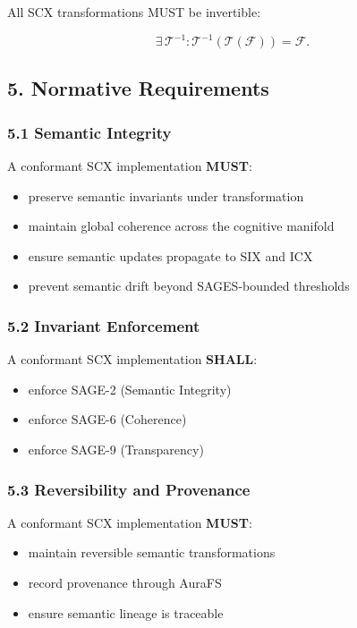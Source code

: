 All SCX transformations MUST be invertible:

\[
\exists \, \mathcal{T}^{-1} : \mathcal{T}^{-1}(\mathcal{T}(\mathcal{F})) = \mathcal{F}.
\]

\subsection{5. Normative Requirements}\label{normative-requirements}

\subsubsection{5.1 Semantic Integrity}\label{semantic-integrity}

A conformant SCX implementation \textbf{MUST}:

\begin{itemize}
\tightlist
\item
  preserve semantic invariants under transformation
\item
  maintain global coherence across the cognitive manifold
\item
  ensure semantic updates propagate to SIX and ICX
\item
  prevent semantic drift beyond SAGES-bounded thresholds
\end{itemize}

\subsubsection{5.2 Invariant Enforcement}\label{invariant-enforcement}

A conformant SCX implementation \textbf{SHALL}:

\begin{itemize}
\tightlist
\item
  enforce SAGE-2 (Semantic Integrity)
\item
  enforce SAGE-6 (Coherence)
\item
  enforce SAGE-9 (Transparency)
\end{itemize}

\subsubsection{5.3 Reversibility and Provenance}\label{reversibility-and-provenance}

A conformant SCX implementation \textbf{MUST}:

\begin{itemize}
\tightlist
\item
  maintain reversible semantic transformations
\item
  record provenance through AuraFS
\item
  ensure semantic lineage is traceable
\end{itemize}

